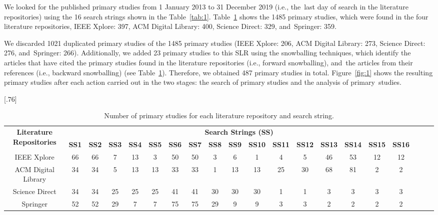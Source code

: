 \documentclass[sensors,review,accept,moreauthors,pdftex]{Definitions/mdpi}
\begin{document}
We looked for the published primary studies from 1 January 2013 to 31 December 2019 (i.e., the~last day of search in the literature repositories) using the 16 search strings shown in the Table~\ref{tab:1}. Table~\ref{tab:2} shows the 1485 primary studies, which were found in the four literature repositories, IEEE Xplore: 397, ACM Digital Library: 400, Science Direct: 329, and~Springer: 359.  




We discarded 1021 duplicated primary studies of the 1485 primary studies (IEEE Xplore: 206, ACM Digital Library: 273, Science Direct: 276, and~Springer: 266). Additionally, we added 23 primary studies to this SLR using the snowballing techniques, which identify the articles that have cited the primary studies found in the literature repositories (i.e., forward snowballing), and~the articles from their references (i.e., backward snowballing) \cite{wohlin2014guidelines} (see Table~\ref{tab:2}). Therefore, we obtained 487 primary studies in total. Figure~\ref{fig:1} shows the resulting primary studies after each action carried out in the two stages: the search of primary studies and the analysis of primary~studies.

\begin{table}[H]
	\caption{Number of primary studies for each literature repository and search string.}
	\label{tab:2}
	\centering
	\scalebox{.76}[.76]{
	\begin{tabular}{cccccccccccccccccccc}
	
		\toprule
		
		\multirow{2}{*}{\textbf{Literature Repositories}\vspace{-5pt}
}&\multicolumn{16}{c}{\textbf{Search Strings (SS)}}\\ \cmidrule{2-17}
		
		&\textbf{SS1}&\textbf{SS2}&\textbf{SS3}&\textbf{SS4}&\textbf{SS5}&\textbf{SS6}&\textbf{SS7}&\textbf{SS8}&\textbf{SS9}&\textbf{SS10}&\textbf{SS11}&\textbf{SS12}&\textbf{SS13}&\textbf{SS14}&\textbf{SS15}&\textbf{SS16}\\
	
		\midrule

	
		IEEE Xplore&66	&66	&7	&13&	3&	50&	50	&3	&6&	1&4&5&46&53&12&12
		\\
		
		ACM Digital Library&34	&34&	5	&13&	13&	33&	33&	1&	13&	13 &25&30&68&81&2&2
		\\
		
		Science Direct&34&	34	&25	&25&	25&	41	&41&	30&	30&	30 &1&1&3&3&3&3
		\\
		
		Springer&52&	52&	29&	7	&7	&75&	75&	29&	9&	9 &3&3&2&2&2&2
		\\
	
		\bottomrule
	\end{tabular}}
\end{table}
\unskip
\end{document}
